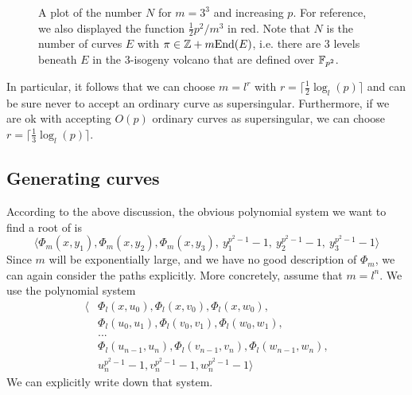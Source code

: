 \begin{figure}
    \begin{center}
    \end{center}
    \caption{
        \label{fig:number_of_fixed_level_curves} A plot of the number $N$ for $m = 3^3$ and increasing $p$.
        For reference, we also displayed the function $\frac 1 2 p^2/m^3$ in red.
        Note that $N$ is the number of curves $E$ with $\pi \in \mathbb{Z} + m\mathrm{End}(E)$, i.e. there are 3 levels beneath $E$ in the 3-isogeny volcano that are defined over $\mathbb{F}_{p^2}$.
    }
\end{figure}
In particular, it follows that we can choose $m = l^r$ with $r = \lceil \frac 1 2 \log_l(p) \rceil$ and can be sure never to accept an ordinary curve as supersingular.
Furthermore, if we are ok with accepting $O(p)$ ordinary curves as supersingular, we can choose $r = \lceil \frac 1 3 \log_l(p) \rceil$.

\subsection{Generating curves}
According to the above discussion, the obvious polynomial system we want to find a root of is
\begin{equation*}
    \langle \Phi_m(x, y_1), \Phi_m(x, y_2), \Phi_m(x, y_3), \ y_1^{p^2 - 1} - 1, \ y_2^{p^2 - 1} - 1, \ y_3^{p^2 - 1} - 1 \rangle
\end{equation*}
Since $m$ will be exponentially large, and we have no good description of $\Phi_m$, we can again consider the paths explicitly.
More concretely, assume that $m = l^n$.
We use the polynomial system
\begin{align*}
    \langle &\Phi_l(x, u_0), \Phi_l(x, v_0), \Phi_l(x, w_0), \\
    &\Phi_l(u_0, u_1), \Phi_l(v_0, v_1), \Phi_l(w_0, w_1), \\
    &... \\
    &\Phi_l(u_{n - 1}, u_n), \Phi_l(v_{n - 1}, v_n), \Phi_l(w_{n - 1}, w_n), \\
    &u_n^{p^2 - 1} - 1, v_n^{p^2 - 1} - 1, w_n^{p^2 - 1} - 1 \rangle
\end{align*}
We can explicitly write down that system.

